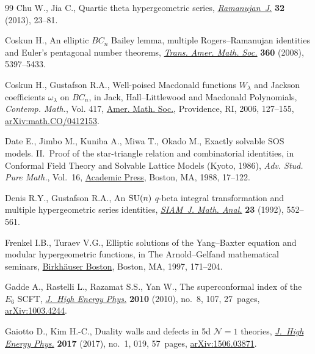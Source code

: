 \documentclass[pdftex]{sigma}%
\numberwithin{equation}{section}
\begin{document}
\begin{thebibliography}{99}
Chu W., Jia C., Quartic theta hypergeometric series, \href{https://doi.org/10.1007/s11139-012-9414-6}{\textit{Ramanujan~J.}}
 \textbf{32} (2013), 23--81.

Coskun H., An elliptic {$BC_n$} {B}ailey lemma, multiple {R}ogers--{R}amanujan
 identities and {E}uler's pentagonal number theorems, \href{https://doi.org/10.1090/S0002-9947-08-04457-7}{\textit{Trans. Amer.
 Math. Soc.}} \textbf{360} (2008), 5397--5433.

Coskun H., Gustafson R.A., Well-poised {M}acdonald functions {$W_\lambda$} and
 {J}ackson coefficients {$\omega_\lambda$} on {$BC_n$}, in Jack,
 {H}all--{L}ittlewood and {M}acdonald Polynomials, \textit{Contemp. Math.},
 Vol. 417, \href{https://doi.org/10.1090/conm/417/07919}{Amer. Math. Soc.}, Providence, RI, 2006, 127--155,
 \href{https://arxiv.org/abs/math.CO/0412153}{arXiv:math.CO/0412153}.

Date E., Jimbo M., Kuniba A., Miwa T., Okado M., Exactly solvable {SOS} models.
 {II}.~{P}roof of the star-triangle relation and combinatorial identities, in
 Conformal Field Theory and Solvable Lattice Models ({K}yoto, 1986),
 \textit{Adv. Stud. Pure Math.}, Vol.~16, \href{https://doi.org/10.2969/aspm/01610017}{Academic Press}, Boston, MA, 1988,
 17--122.

Denis R.Y., Gustafson R.A., An {${\rm SU}(n)$} {$q$}-beta integral
 transformation and multiple hypergeometric series identities, \href{https://doi.org/10.1137/0523027}{\textit{SIAM~J.
 Math. Anal.}} \textbf{23} (1992), 552--561.

Frenkel I.B., Turaev V.G., Elliptic solutions of the {Y}ang--{B}axter equation
 and modular hypergeometric functions, in The {A}rnold--{G}elfand mathematical
 seminars, \href{https://doi.org/10.1007/978-1-4612-4122-5_9}{Birkh\"auser Boston}, Boston, MA, 1997, 171--204.

Gadde A., Rastelli L., Razamat S.S., Yan W., The superconformal index of the
 {$E_6$} {SCFT}, \href{https://doi.org/10.1007/JHEP08(2010)107}{\textit{J.~High Energy Phys.}} \textbf{2010} (2010), no.~8,
 107, 27~pages, \href{https://arxiv.org/abs/1003.4244}{arXiv:1003.4244}.

Gaiotto D., Kim H.-C., Duality walls and defects in 5d {${\mathcal N}=1$}
 theories, \href{https://doi.org/10.1007/JHEP01(2017)019}{\textit{J.~High Energy Phys.}} \textbf{2017} (2017), no.~1, 019,
 57~pages, \href{https://arxiv.org/abs/1506.03871}{arXiv:1506.03871}.


\end{thebibliography}
\end{document}
